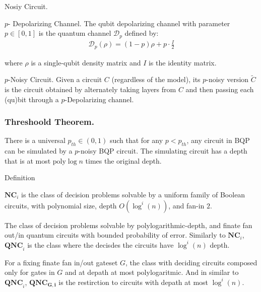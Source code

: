 \documentclass{beamer}
\newcommand*{\QNC}{ \mathbf{QNC} }
\newcommand*{\QNCG}{ \mathbf{QNC_G} }
\newcommand*{\NC}{\mathbf{NC}}
\newcommand*{\QNCiG}{\mathbf{QNC_{G,i}}}
\begin{document}
\begin{frame}{Nosiy Circuit.}
  \begin{definition}{ $p$- Depolarizing Channel. } 
    The qubit depolarizing channel with parameter $ p \in [0,1] $ is the quantum channel $ \mathcal{D}_p $ defined by:
\begin{equation*}
  \begin{split}
\mathcal{D}_p(\rho) = (1 - p) \rho + p \cdot \frac{I}{2}
  \end{split}
\end{equation*}

where $ \rho $ is a single-qubit density matrix and $ I $ is the identity matrix.

  \end{definition}
  \begin{definition}{$p$-Noisy Circuit.}
    Given a circuit $C$ (regardless of the model), its $p$-noisy version $\tilde{C}$ is the circuit obtained by alternately taking layers from $C$ and then passing each (qu)bit through a $p$-Depolarizing channel.
  \end{definition}
\end{frame}


\begin{frame}
  \frametitle{Threshoold Theorem.} 
  \begin{theorem}
There is a universal $p_{th} \in (0,1)$ such that for any $p < p_{th}$, any circuit in BQP can be simulated by a $p$-noisy BQP circuit. The simulating circuit has a depth that is at most $\text{poly} \log n$ times the original depth.
  \end{theorem}
\end{frame}



\begin{frame}{Definition}
\begin{definition}[$\NC$ - Nick's Class]
$\NC_i$ is the class of decision problems solvable by a uniform family of Boolean circuits, with polynomial size, depth $O(\log^i(n))$, and fan-in $2$. 
\end{definition}

\begin{definition}[$\QNC$]
  The class of decision problems solvable by polylogarithmic-depth, and finate fan out/in quantum circuits with bounded probability of error. Similarly to $\NC_i$, $\QNC_i$ is the class where the decisdes the circuits have $\log^i (n)$ depth.  
\end{definition}

\begin{definition}[$\QNCG$]
  For a fixing finate fan in/out gateset $G$, the class with deciding circuits composed only for gates in $G$ and at depath at most polylogaritmic. And in similar to $\QNC_{i}$, $\QNCiG$ is the restirction to circuits with depath at most $\log^{i}(n)$.  
\end{definition}
\end{frame}
\end{document}
